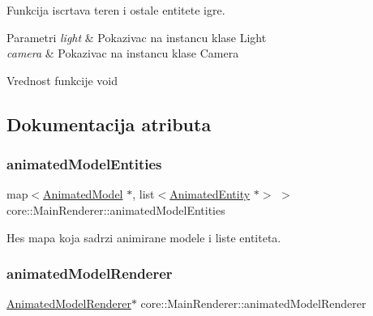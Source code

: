 Funkcija iscrtava teren i ostale entitete igre. 


\begin{DoxyParams}{Parametri}
{\em light} & Pokazivac na instancu klase Light \\
\hline
{\em camera} & Pokazivac na instancu klase Camera \\
\hline
\end{DoxyParams}
\begin{DoxyReturn}{Vrednost funkcije}
void 
\end{DoxyReturn}


\subsection{Dokumentacija atributa}
\mbox{\label{classcore_1_1MainRenderer_a9ec98b646c857dd05b42a5c1961c3b9d}} 
\subsubsection{\texorpdfstring{animated\+Model\+Entities}{animatedModelEntities}}
{\footnotesize\ttfamily map$<$\hyperlink{classmodel_1_1AnimatedModel}{Animated\+Model} $\ast$, list$<$\hyperlink{classentity_1_1AnimatedEntity}{Animated\+Entity} $\ast$$>$ $>$ core\+::\+Main\+Renderer\+::animated\+Model\+Entities\hspace{0.3cm}{\ttfamily [private]}}



Hes mapa koja sadrzi animirane modele i liste entiteta. 

\mbox{\label{classcore_1_1MainRenderer_a90bd7e1f715fd09726103eb412b6149e}} 
\subsubsection{\texorpdfstring{animated\+Model\+Renderer}{animatedModelRenderer}}
{\footnotesize\ttfamily \hyperlink{classcore_1_1AnimatedModelRenderer}{Animated\+Model\+Renderer}$\ast$ core\+::\+Main\+Renderer\+::animated\+Model\+Renderer\hspace{0.3cm}{\ttfamily [private]}}



